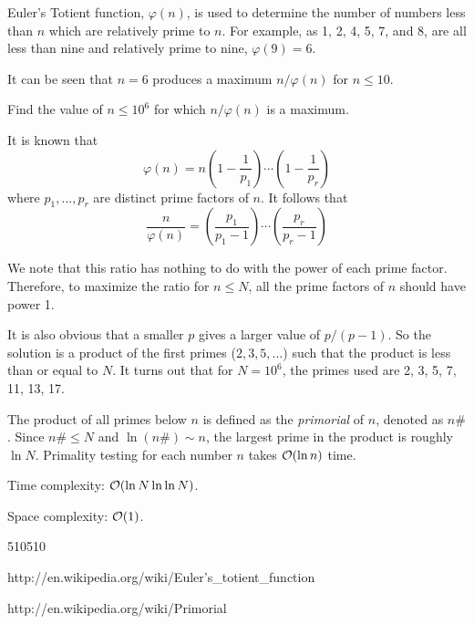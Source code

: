 




Euler's Totient function, $\varphi(n)$, is used to determine the number of numbers less than $n$ which are relatively prime to $n$. For example, as 1, 2, 4, 5, 7, and 8, are all less than nine and relatively prime to nine, $\varphi(9)=6$.

It can be seen that $n=6$ produces a maximum $n/\varphi(n)$ for $n \le 10$.

Find the value of $n \le 10^6$ for which $n/\varphi(n)$ is a maximum.

\solution

It is known that
\[
\varphi(n) = n \left(1-\frac{1}{p_1} \right) \cdots \left(1-\frac{1}{p_r}\right)
\]
where $p_1, \ldots, p_r$ are distinct prime factors of $n$. It follows that
\[
\frac{n}{\varphi(n)} = \left(\frac{p_1}{p_1-1}\right) \cdots \left(\frac{p_r}{p_r-1}\right)
\]

We note that this ratio has nothing to do with the power of each prime factor. Therefore, to maximize the ratio for $n \le N$, all the prime factors of $n$ should have power 1.

It is also obvious that a smaller $p$ gives a larger value of $p/(p-1)$. So the solution is a product of the first primes ($2, 3, 5, \ldots$) such that the product is less than or equal to $N$. It turns out that for $N = 10^6$, the primes used are 2, 3, 5, 7, 11, 13, 17.

\complexity

The product of all primes below $n$ is defined as the \emph{primorial} of $n$, denoted as $n \#$. Since $n \# \le N$ and $\ln (n \#) \sim n$, the largest prime in the product is roughly $\ln N$. Primality testing for each number $n$ takes $\mathcal{O}(\ln n)$ time.

Time complexity: $\mathcal{O}(\ln N \ln \ln N)$.

Space complexity: $\mathcal{O}(1)$.

\answer

510510


http://en.wikipedia.org/wiki/Euler's\_totient\_function

http://en.wikipedia.org/wiki/Primorial

 
